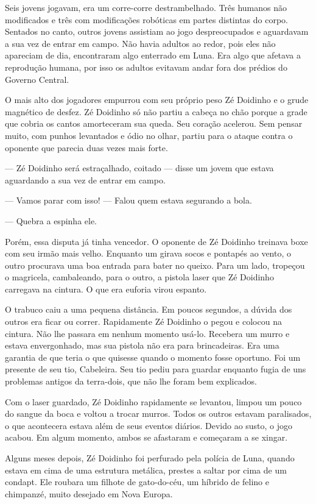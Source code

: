 \documentclass[a4paper,14pt]{book}
\begin{document}
Seis jovens jogavam, era um corre-corre destrambelhado. Três humanos não modificados e três com modificações robóticas em partes distintas do corpo. Sentados no canto, outros jovens assistiam ao jogo despreocupados e aguardavam a sua vez de entrar em campo. Não havia adultos ao redor, pois eles não apareciam de dia, encontraram algo enterrado em Luna. Era algo que afetava a reprodução humana, por isso os adultos evitavam andar fora dos prédios do Governo Central.

O mais alto dos jogadores empurrou com seu próprio peso Zé Doidinho e o grude magnético de desfez. Zé Doidinho só não partiu a cabeça no chão porque a grade que cobria os cantos amorteceram sua queda. Seu coração acelerou. Sem pensar muito, com punhos levantados e ódio no olhar, partiu para o ataque contra o oponente que parecia duas vezes mais forte.

— Zé Doidinho será estraçalhado, coitado — disse um jovem que estava aguardando a sua vez de entrar em campo.

— Vamos parar com isso! — Falou quem estava segurando a bola.

— Quebra a espinha ele.

Porém, essa disputa já tinha vencedor. O oponente de Zé Doidinho treinava boxe com seu irmão mais velho. Enquanto um girava socos e pontapés ao vento, o outro procurava uma boa entrada para bater no queixo. Para um lado, tropeçou o magricela, cambaleando, para o outro, a pistola laser que Zé Doidinho carregava na cintura. O que era euforia virou espanto.

O trabuco caiu a uma pequena distância. Em poucos segundos, a dúvida dos outros era ficar ou correr. Rapidamente Zé Doidinho o pegou e colocou na cintura. Não lhe passara em nenhum momento usá-lo. Recebera um murro e estava envergonhado, mas sua pistola não era para brincadeiras. Era uma garantia de que teria o que quisesse quando o momento fosse oportuno. Foi um presente de seu tio, Cabeleira. Seu tio pediu para guardar enquanto fugia de uns problemas antigos da terra-dois, que não lhe foram bem explicados.

Com o laser guardado, Zé Doidinho rapidamente se levantou, limpou um pouco do sangue da boca e voltou a trocar murros. Todos os outros estavam paralisados, o que acontecera estava além de seus eventos diários. Devido ao susto, o jogo acabou. Em algum momento, ambos se afastaram e começaram a se xingar.

Alguns meses depois, Zé Doidinho foi perfurado pela polícia de Luna, quando estava em cima de uma estrutura metálica, prestes a saltar por cima de um condapt. Ele roubara um filhote de gato-do-céu, um híbrido de felino e chimpanzé, muito desejado em Nova Europa.
\end{document}
